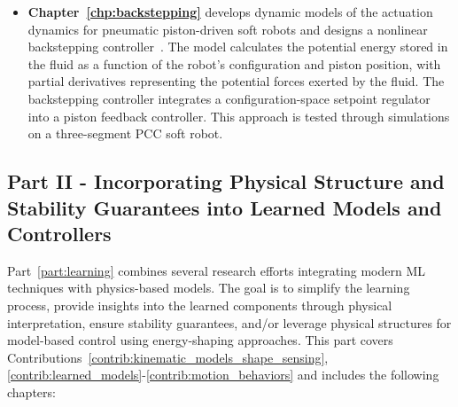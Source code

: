\begin{itemize}
    \item \textbf{Chapter~\ref{chp:backstepping}} develops dynamic models of the actuation dynamics for pneumatic piston-driven soft robots and designs a nonlinear backstepping controller~\citep{kokotovic1992joy, lozano1992adaptive, khalil2002nonlinear}. The model calculates the potential energy stored in the fluid as a function of the robot's configuration and piston position, with partial derivatives representing the potential forces exerted by the fluid. The backstepping controller integrates a configuration-space setpoint regulator into a piston feedback controller. This approach is tested through simulations on a three-segment \gls{PCC} soft robot.  
\end{itemize}

\subsection*{Part II - Incorporating Physical Structure and Stability Guarantees into Learned Models and Controllers}

Part~\ref{part:learning} combines several research efforts integrating modern \gls{ML} techniques with physics-based models. The goal is to simplify the learning process, provide insights into the learned components through physical interpretation, ensure stability guarantees, and/or leverage physical structures for model-based control using energy-shaping approaches. This part covers Contributions~\ref{contrib:kinematic_models_shape_sensing},\ref{contrib:learned_models}-\ref{contrib:motion_behaviors} and includes the following chapters:

